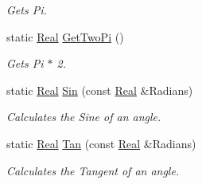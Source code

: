 \begin{DoxyCompactItemize}
\begin{DoxyCompactList}\small\item\em Gets Pi. \item\end{DoxyCompactList}\item 
static \hyperlink{namespacephys_af7eb897198d265b8e868f45240230d5f}{Real} \hyperlink{classphys_1_1MathTool_a7b3fef73ed82d585755d11a001290f65}{GetTwoPi} ()
\begin{DoxyCompactList}\small\item\em Gets Pi $\ast$ 2. \item\end{DoxyCompactList}\item 
static \hyperlink{namespacephys_af7eb897198d265b8e868f45240230d5f}{Real} \hyperlink{classphys_1_1MathTool_a91b41510f0788d9304ddd112236356f9}{Sin} (const \hyperlink{namespacephys_af7eb897198d265b8e868f45240230d5f}{Real} \&Radians)
\begin{DoxyCompactList}\small\item\em Calculates the Sine of an angle. \item\end{DoxyCompactList}\item 
static \hyperlink{namespacephys_af7eb897198d265b8e868f45240230d5f}{Real} \hyperlink{classphys_1_1MathTool_a8d5e4afe0e8e014f61bfefba2ffc0ede}{Tan} (const \hyperlink{namespacephys_af7eb897198d265b8e868f45240230d5f}{Real} \&Radians)
\begin{DoxyCompactList}\small\item\em Calculates the Tangent of an angle. \item\end{DoxyCompactList}\end{DoxyCompactItemize}
